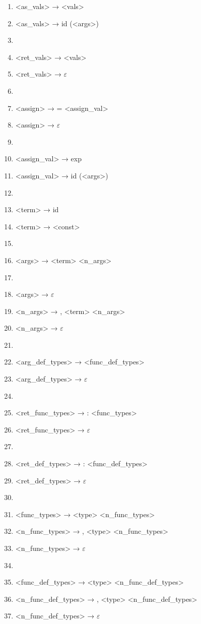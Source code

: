 \documentclass[a4paper, 12pt]{article}
\begin{document}
\begin{enumerate}
    \item <as\_vals> → <vals>
    \item <as\_vals> → id (<args>)
    \item[]
    \item <ret\_vals> → <vals>
    \item <ret\_vals> → $\varepsilon$
    \item[]
    \item <assign> → = <assign\_val>
    \item <assign> → $\varepsilon$
    \item[]
    \item <assign\_val> → exp
    \item <assign\_val> → id (<args>)
    \item[]
    \item <term> → id
    \item <term> → <const>
    \item[]
    \item <args> → <term> <n\_args>
    \item[]
    \item <args> → $\varepsilon$
    \item <n\_args> → , <term> <n\_args>
    \item <n\_args> → $\varepsilon$
    \item[]
    \item <arg\_def\_types> → <func\_def\_types>
    \item <arg\_def\_types> → $\varepsilon$
    \item[]
    \item <ret\_func\_types> → : <func\_types>
    \item <ret\_func\_types> → $\varepsilon$
    \item[]
    \item <ret\_def\_types> → : <func\_def\_types>
    \item <ret\_def\_types> → $\varepsilon$
    \item[]
    \item <func\_types> → <type>  <n\_func\_types>
    \item <n\_func\_types> → , <type>  <n\_func\_types>
    \item <n\_func\_types> → $\varepsilon$
    \item[]
    \item <func\_def\_types> → <type>  <n\_func\_def\_types>
    \item <n\_func\_def\_types> → , <type>  <n\_func\_def\_types>
    \item <n\_func\_def\_types> → $\varepsilon$

\end{enumerate}
\end{document}
